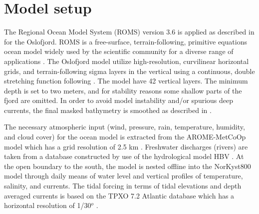 \section{Model setup}
\label{sec:model_setup}

The Regional Ocean Model System (ROMS) version 3.6 is applied as described in \cite{roed16} for the Oslofjord. ROMS is a free-surface, terrain-following, primitive equations ocean model widely used by the scientific community for a diverse range of applications \cite[]{shchepetkin05,shchepetkin09,haidvogel08}. 
The Oslofjord model utilize high-resolution, curvilinear horizontal grids, and terrain-following sigma layers in the vertical using a continuous, double stretching function following \cite{shchepetkin09}. The model have 42 vertical layers. The minimum depth is set to two meters, and for stability reasons some shallow parts of the fjord are omitted. In order to avoid model instability and/or spurious deep currents, the final masked bathymetry is smoothed as described in \cite{roed16}.



The necessary atmospheric input (wind, pressure, rain, temperature, humidity, and cloud cover) for the ocean model is extracted from the AROME-MetCoOp model which has a grid resolution of 2.5 km \cite[]{muller2015}. Freshwater discharges (rivers) are taken from a database constructed by use of the hydrological model HBV \cite[]{beldring2003}. At the open boundary to the south, the model is nested offline into the NorKyst800 model \cite[]{albretsen11} through daily means of water level and vertical profiles of temperature, salinity, and currents.  
The tidal forcing in terms of tidal elevations and depth averaged currents is based on the TPXO 7.2 Atlantic database which has a horizontal resolution of 1/30$^o$ \cite[]{egbert02}.


